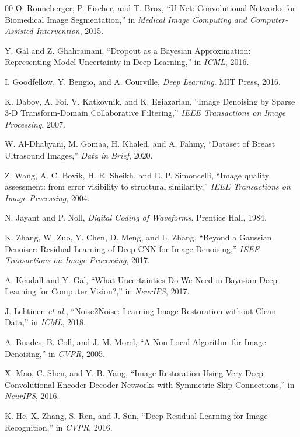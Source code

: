 \documentclass[conference]{IEEEtran}
\begin{document}
\begin{thebibliography}{00}
 O. Ronneberger, P. Fischer, and T. Brox, ``U-Net: Convolutional Networks for Biomedical Image Segmentation,'' in \emph{Medical Image Computing and Computer-Assisted Intervention}, 2015.

 Y. Gal and Z. Ghahramani, ``Dropout as a Bayesian Approximation: Representing Model Uncertainty in Deep Learning,'' in \emph{ICML}, 2016.

 I. Goodfellow, Y. Bengio, and A. Courville, \emph{Deep Learning}. MIT Press, 2016.

 K. Dabov, A. Foi, V. Katkovnik, and K. Egiazarian, ``Image Denoising by Sparse 3-D Transform-Domain Collaborative Filtering,'' \emph{IEEE Transactions on Image Processing}, 2007.

 W. Al-Dhabyani, M. Gomaa, H. Khaled, and A. Fahmy, ``Dataset of Breast Ultrasound Images,'' \emph{Data in Brief}, 2020.

 Z. Wang, A. C. Bovik, H. R. Sheikh, and E. P. Simoncelli, ``Image quality assessment: from error visibility to structural similarity,'' \emph{IEEE Transactions on Image Processing}, 2004.

 N. Jayant and P. Noll, \emph{Digital Coding of Waveforms}. Prentice Hall, 1984.

 K. Zhang, W. Zuo, Y. Chen, D. Meng, and L. Zhang, ``Beyond a Gaussian Denoiser: Residual Learning of Deep CNN for Image Denoising,'' \emph{IEEE Transactions on Image Processing}, 2017.

 A. Kendall and Y. Gal, ``What Uncertainties Do We Need in Bayesian Deep Learning for Computer Vision?,'' in \emph{NeurIPS}, 2017.

 J. Lehtinen \emph{et al.}, ``Noise2Noise: Learning Image Restoration without Clean Data,'' in \emph{ICML}, 2018.

 A. Buades, B. Coll, and J.-M. Morel, ``A Non-Local Algorithm for Image Denoising,'' in \emph{CVPR}, 2005.

 X. Mao, C. Shen, and Y.-B. Yang, ``Image Restoration Using Very Deep Convolutional Encoder-Decoder Networks with Symmetric Skip Connections,'' in \emph{NeurIPS}, 2016.

 K. He, X. Zhang, S. Ren, and J. Sun, ``Deep Residual Learning for Image Recognition,'' in \emph{CVPR}, 2016.


\end{thebibliography}
\end{document}
